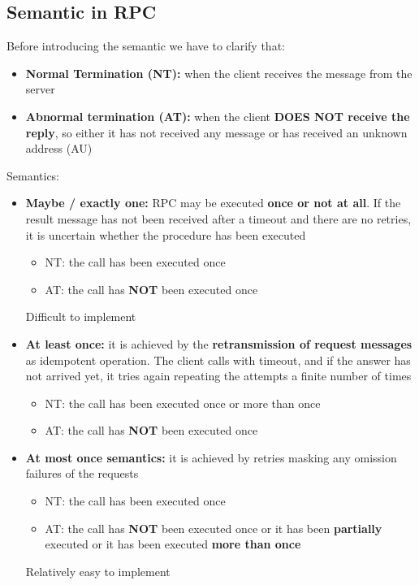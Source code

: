 \subsection{Semantic in RPC}
Before introducing the semantic we have to clarify that:
\begin{itemize}
    \item \textbf{Normal Termination (NT):} when the client receives the message from the server
    \item \textbf{Abnormal termination (AT):} when the client \textbf{DOES NOT receive the reply}, so either it has not received any message or has received an unknown address (AU)
\end{itemize}
Semantics:
\begin{itemize}
    \item \textbf{Maybe / exactly one:} RPC may be executed \textbf{once or not at all}. If the result message has not been received after a timeout and there are no retries, it is uncertain whether the procedure has been executed
        \begin{itemize}
            \item NT: the call has been executed once
            \item AT: the call has \textbf{NOT} been executed once
        \end{itemize}
    Difficult to implement
    \item \textbf{At least once:} it is achieved by the \textbf{retransmission of request messages} as idempotent operation. The client calls with timeout, and if the answer has not arrived yet, it tries again repeating the attempts a finite number of times
        \begin{itemize}
            \item NT: the call has been executed once or more than once
            \item AT: the call has \textbf{NOT} been executed once
        \end{itemize}
    \item \textbf{At most once semantics:} it is achieved by retries masking any omission failures of the requests
        \begin{itemize}
            \item NT: the call has been executed once
            \item AT: the call has \textbf{NOT} been executed once or it has been \textbf{partially} executed or it has been executed \textbf{more than once}
        \end{itemize}
    Relatively easy to implement
\end{itemize}

